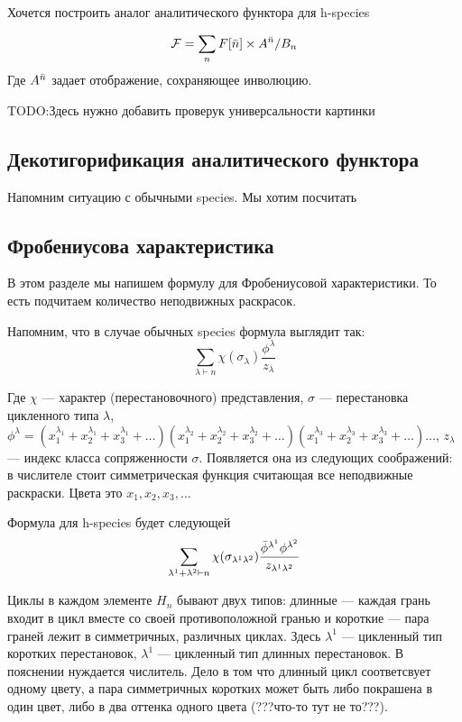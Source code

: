 Хочется построить аналог аналитического функтора для h-species


\begin{equation}
\label{eq:h-an}
	\mathcal F = \sum\limits_n F[\Bar n] \times A^{\Bar n} / B_n
\end{equation}
Где $A^{\Bar n}$ задает отображение, сохраняющее инволюцию. 

TODO:Здесь нужно добавить проверук универсальности картинки

\subsection{Декотигорификация аналитического функтора}
Напомним ситуацию с обычными species.
Мы хотим посчитать 

\subsection{Фробениусова характеристика}

В этом разделе мы напишем формулу для Фробениусовой характеристики.
То есть подчитаем количество неподвижных раскрасок.

Напомним, что в случае обычных species формула выглядит так:
\begin{equation}
\label{eq:fr}
\sum_{\lambda \vdash n}\chi(\sigma_{\lambda}) \frac{\phi^{\lambda}}{z_{\lambda}}
\end{equation}

Где $\chi$ --- характер (перестановочного) представления, $\sigma$ ---
перестановка цикленного типа $\lambda$, 
$\phi^{\lambda} = 
(x_1^{\lambda_1} + x_2^{\lambda_1} + x_3^{\lambda_1} + \dots)
(x_1^{\lambda_2} + x_2^{\lambda_2} + x_3^{\lambda_2} + \dots)
(x_1^{\lambda_3} + x_2^{\lambda_3} + x_3^{\lambda_3} + \dots)
\dots$,
 $z_\lambda$ --- индекс класса сопряженности $\sigma$.
Появляется она из следующих соображений: в числителе стоит симметрическая
функция считающая все неподвижные раскраски. Цвета это $x_1, x_2, x_3, \dots$

Формула для h-species будет следующей
\begin{equation}
\label{eq:h-fr}
\sum_{\lambda^1 + \lambda^2 \vdash n}\chi(\sigma_{\lambda^1 \lambda^2})
\frac{\Bar{\phi}^{\lambda^1} \phi^{\lambda^2}}{z_{\lambda^1 \lambda^2}}
\end{equation}

Циклы в каждом элементе $H_n$ бывают двух типов:
длинные --- каждая грань входит в цикл вместе со своей противоположной гранью и
короткие --- пара граней лежит в симметричных, различных циклах. Здесь
$\lambda^1$ --- цикленный тип коротких перестановок, $\lambda^1$ --- цикленный тип длинных перестановок.
В пояснении нуждается числитель. Дело в том что длинный цикл соответсвует
одному цвету, а пара симметричных коротких может быть либо покрашена в один
цвет, либо в два оттенка одного цвета (???что-то тут не то???).

